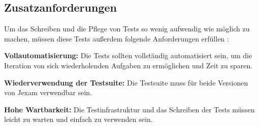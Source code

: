 \subsection{Zusatzanforderungen}

Um das Schreiben und die Pflege von Tests so wenig aufwendig wie m\"oglich
zu machen, m\"ussen diese Tests au{\ss}erdem folgende Anforderungen erf\"ullen :


\textbf{Vollautomatisierung:}  Die Tests sollten vollst\"andig automatisiert sein,
um die Iteration von sich wiederholenden Aufgaben zu erm\"oglichen
und Zeit zu sparen.

\textbf{Wiederverwendung der Testsuite:} Die Testsuite muss f\"ur beide Versionen 
von Jexam verwendbar sein.

\textbf{Hohe Wartbarkeit:} Die Testinfrastruktur und das Schreiben der Tests
m\"ussen leicht zu warten und einfach zu verwenden sein.
